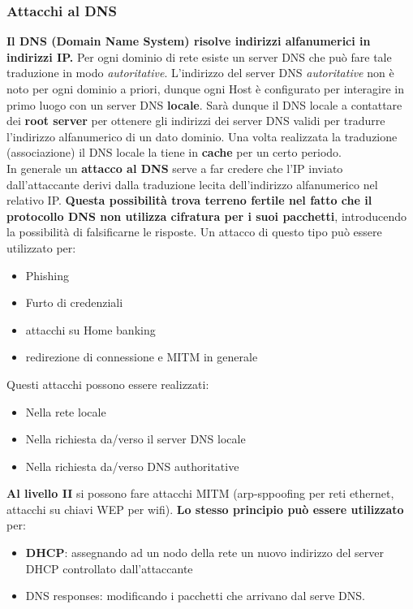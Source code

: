 \documentclass[12pt]{article}
\begin{document}
			\subsubsection{Attacchi al DNS}
				\textbf{Il DNS (Domain Name System) risolve indirizzi alfanumerici in indirizzi IP.} Per ogni dominio di rete esiste un server DNS che può fare tale traduzione in modo \textit{autoritative}. L'indirizzo del server DNS \textit{autoritative} non è noto per ogni dominio a priori, dunque ogni Host è configurato per interagire in primo luogo con un server DNS \textbf{locale}. Sarà dunque il DNS locale a contattare dei \textbf{root server} per ottenere gli indirizzi dei server DNS validi per tradurre l'indirizzo alfanumerico di un dato dominio. Una volta realizzata la traduzione (associazione) il DNS locale la tiene in \textbf{cache} per un certo periodo.\\
				In generale un \textbf{attacco al DNS} serve a far credere che l'IP inviato dall'attaccante derivi dalla traduzione lecita dell'indirizzo alfanumerico nel relativo IP. \textbf{Questa possibilità trova terreno fertile nel fatto che il protocollo DNS non utilizza cifratura per i suoi pacchetti}, introducendo la possibilità di falsificarne le risposte. Un attacco di questo tipo può essere utilizzato per:
				\begin{itemize}
					\item Phishing
					\item Furto di credenziali
					\item attacchi su Home banking 
					\item redirezione di connessione e MITM in generale
				\end{itemize} 
				Questi attacchi possono essere realizzati:
				\begin{itemize}
					\item Nella rete locale
					\item Nella richiesta da/verso il server DNS locale
					\item Nella richiesta da/verso DNS authoritative
				\end{itemize}
				\textbf{Al livello II} si possono fare attacchi MITM (arp-sppoofing per reti ethernet, attacchi su chiavi WEP per wifi). \textbf{Lo stesso principio può essere utilizzato} per:
				\begin{itemize}
					\item \textbf{DHCP}: assegnando ad un nodo della rete  un nuovo indirizzo del server DHCP controllato dall'attaccante
					\item DNS responses: modificando i pacchetti che arrivano dal serve DNS. 				
				\end{itemize} 
\end{document}
